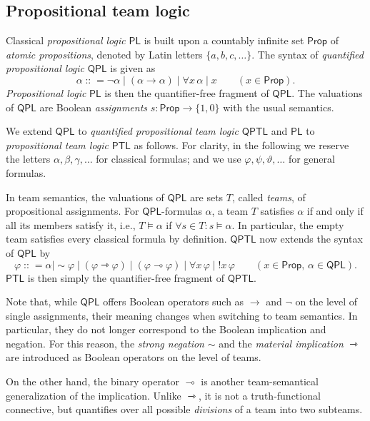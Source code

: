 \documentclass[a4paper,english,fleqn,11pt,final]{scrartcl}
\makeatletter
\newcommand{\ie}{i.e.\@\xspace}
\newcommand{\negg}{{\sim}}
\newcommand{\logic}[1]{\ensuremath{\mathsf{#1}}\xspace}
\newcommand{\PS}{\logic{Prop}}
\newcommand{\PL}{\logic{PL}}
\newcommand{\QPL}{\logic{QPL}}
\newcommand{\PTL}{\logic{PTL}}
\newcommand{\QPTL}{\logic{QPTL}}
\providecommand{\ddfn}{\mathrel{\mathop{{\mathop:}{\mathop:}}}=}
\newcommand{\imp}{\rightarrow}
\newcommand{\limp}{\multimap}
\newcommand{\timp}{\rightarrowtriangle}
\DeclareMathOperator{\shriek}{!}
\theoremstyle{plain}
\theoremstyle{definition}
\makeatother
\begin{document}
\subsection{Propositional team logic}

Classical \emph{propositional logic} $\PL$ is built upon a countably infinite set $\PS$ of \emph{atomic propositions}, denoted by Latin letters $\{ a, b, c, \ldots \}$.
The syntax of \emph{quantified propositional logic} $\QPL$ is given as
\[
\alpha \ddfn \neg \alpha \mid (\alpha \imp \alpha) \mid \forall x \,\alpha \mid x \qquad (x \in \PS)\text{.}
\]
\emph{Propositional logic} $\PL$ is then the quantifier-free fragment of $\QPL$.
The valuations of $\QPL$ are Boolean \emph{assignments} $s \colon \PS \to \{ 1, 0 \}$ with the usual semantics.


\medskip

We extend $\QPL$ to \emph{quantified propositional team logic} $\QPTL$ \cite{hannula_complexity_2015,gandalf} and $\PL$ to \emph{propositional team logic} $\PTL$ \cite{yang_propositional_2017} as follows.
For clarity, in the following we reserve the letters $\alpha, \beta,\gamma,\ldots$ for classical formulas;
and we use $\varphi, \psi, \vartheta,\ldots$ for general formulas.

In team semantics, the valuations of $\QPL$ are sets $T$, called \emph{teams}, of propositional assignments.
For $\QPL$-formulas $\alpha$, a team $T$ satisfies $\alpha$ if and only if all its members satisfy it, \ie, $T \vDash \alpha$ if $\forall s \in T : s \vDash \alpha$.
In particular, the empty team satisfies every classical formula by definition.
$\QPTL$ now extends the syntax of $\QPL$ by
\[
\varphi \ddfn \alpha \mid \negg \varphi \mid (\varphi \timp \varphi) \mid (\varphi \limp \varphi) \mid \forall x \,\varphi \mid \shriek x \,\varphi \qquad (x \in \PS\text{, }\alpha \in \QPL)\text{.}
\]
$\PTL$ is then simply the quantifier-free fragment of $\QPTL$.

Note that, while $\QPL$ offers Boolean operators such as $\imp$ and $\neg$ on the level of single assignments, their meaning changes when switching to team semantics.
In particular, they do not longer correspond to the Boolean implication and negation.
For this reason, the \emph{strong negation} $\negg$ and the \emph{material implication} $\timp$ are introduced as Boolean operators on the level of teams.

On the other hand, the binary operator $\limp$ is another team-semantical generalization of the implication.
Unlike $\timp$, it is not a truth-functional connective, but quantifies over all possible \emph{divisions} of a team into two subteams.
\end{document}

